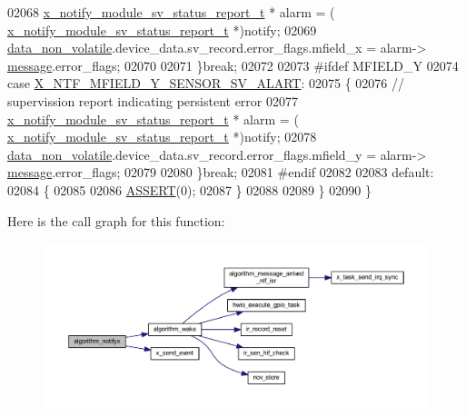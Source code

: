 \begin{DoxyCode}
02068             \hyperlink{a00021_d7/d1b/a00864}{x\_notify\_module\_sv\_status\_report\_t} * alarm = (
      \hyperlink{a00021_d7/d1b/a00864}{x\_notify\_module\_sv\_status\_report\_t} *)notify;
02069             \hyperlink{a00060_a76ac5f917f5308dcd83de0d7c94559fb}{data\_non\_volatile}.device\_data.sv\_record.error\_flags.mfield\_x = alarm->
      \hyperlink{a00021_a13393a2d1589483b3bae4d2e79f43980}{message}.error\_flags;
02070       
02071         \}\textcolor{keywordflow}{break};
02072 
02073 \textcolor{preprocessor}{#ifdef MFIELD\_Y}
02074         \textcolor{keywordflow}{case}  \hyperlink{a00021_ad30200601c6761f2c9be1fd62df00421}{X\_NTF\_MFIELD\_Y\_SENSOR\_SV\_ALART}:
02075         \{        
02076             \textcolor{comment}{// supervission report indicating persistent error}
02077             \hyperlink{a00021_d7/d1b/a00864}{x\_notify\_module\_sv\_status\_report\_t} * alarm = (
      \hyperlink{a00021_d7/d1b/a00864}{x\_notify\_module\_sv\_status\_report\_t} *)notify;
02078             \hyperlink{a00060_a76ac5f917f5308dcd83de0d7c94559fb}{data\_non\_volatile}.device\_data.sv\_record.error\_flags.mfield\_y = alarm->
      \hyperlink{a00021_a13393a2d1589483b3bae4d2e79f43980}{message}.error\_flags;
02079             
02080         \}\textcolor{keywordflow}{break};
02081 \textcolor{preprocessor}{#endif}
02082 
02083         \textcolor{keywordflow}{default}:
02084         \{
02085 
02086             \hyperlink{a00072_abb8ff8e213ac9f6fb21d2b968583b936}{ASSERT}(0);
02087         \}
02088         
02089     \}
02090 \}
\end{DoxyCode}


Here is the call graph for this function\+:\nopagebreak
\begin{figure}[H]
\begin{center}
\leavevmode
\includegraphics[width=350pt]{de/d11/a00021_a93269cdec3e21934aa9395440a2de605_cgraph}
\end{center}
\end{figure}




